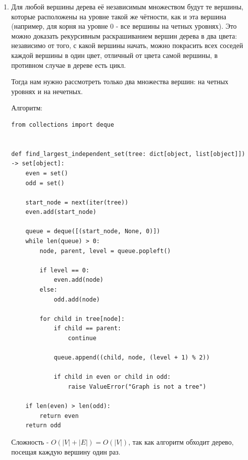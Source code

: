 \documentclass{article}
\begin{document}
\begin{enumerate}
\begin{lstlisting}
        if not changed:
            return dist

    changed = update_dist(graph, dist)

    if changed:
        raise ValueError("Negative cycle detected")

    return dist
          \end{lstlisting}

	      Сложность алгоритма $O(k |E|)$, так как
	      на каждой из $k$ итераций происходит обновление
	      всех $|E|$ рёбер.

	\item Для любой вершины дерева её независимым множеством
	      будут те вершины, которые расположены на уровне
	      такой же чётности, как и эта вершина (например, для корня на
	      уровне 0 - все вершины на четных уровнях). Это можно доказать
	      рекурсивным раскрашиванием вершин дерева в два цвета:
	      независимо от того, с какой вершины начать, можно покрасить
	      всех соседей каждой вершины в один цвет, отличный от цвета
	      самой вершины, в противном случае в дереве есть цикл.

	      Тогда нам нужно рассмотреть только два множества вершин:
	      на четных уровнях и на нечетных.

	      Алгоритм:
	      \begin{lstlisting}
from collections import deque


def find_largest_independent_set(tree: dict[object, list[object]]) -> set[object]:
    even = set()
    odd = set()

    start_node = next(iter(tree))
    even.add(start_node)

    queue = deque([(start_node, None, 0)])
    while len(queue) > 0:
        node, parent, level = queue.popleft()

        if level == 0:
            even.add(node)
        else:
            odd.add(node)

        for child in tree[node]:
            if child == parent:
                continue

            queue.append((child, node, (level + 1) % 2))

            if child in even or child in odd:
                raise ValueError("Graph is not a tree")

    if len(even) > len(odd):
        return even
    return odd
    \end{lstlisting}
	      Сложность - $O(|V| + |E|) = O(|V|)$, так как алгоритм обходит дерево,
	      посещая каждую вершину один раз.


\end{enumerate}
\end{document}
